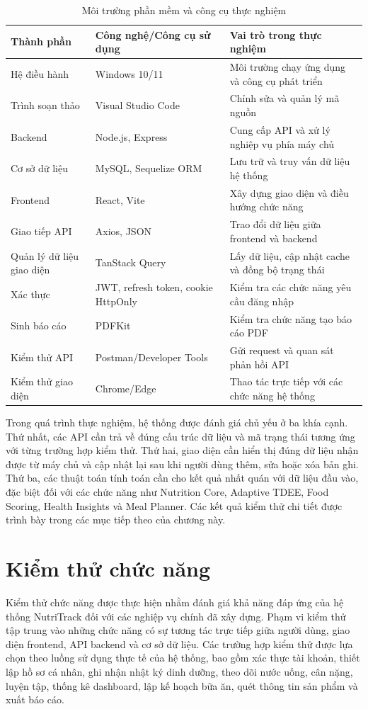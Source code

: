 \documentclass[12pt, a4paper]{report}
\begin{document}
\begin{table}[htbp]
\centering
\caption{Môi trường phần mềm và công cụ thực nghiệm}
\begin{tabular}{|p{4cm}|p{4cm}|p{7cm}|}
\hline
\textbf{Thành phần} & \textbf{Công nghệ/Công cụ sử dụng} & \textbf{Vai trò trong thực nghiệm} \\
\hline
Hệ điều hành & Windows 10/11 & Môi trường chạy ứng dụng và công cụ phát triển \\
\hline
Trình soạn thảo & Visual Studio Code & Chỉnh sửa và quản lý mã nguồn \\
\hline
Backend & Node.js, Express & Cung cấp API và xử lý nghiệp vụ phía máy chủ \\
\hline
Cơ sở dữ liệu & MySQL, Sequelize ORM & Lưu trữ và truy vấn dữ liệu hệ thống \\
\hline
Frontend & React, Vite & Xây dựng giao diện và điều hướng chức năng \\
\hline
Giao tiếp API & Axios, JSON & Trao đổi dữ liệu giữa frontend và backend \\
\hline
Quản lý dữ liệu giao diện & TanStack Query & Lấy dữ liệu, cập nhật cache và đồng bộ trạng thái \\
\hline
Xác thực & JWT, refresh token, cookie HttpOnly & Kiểm tra các chức năng yêu cầu đăng nhập \\
\hline
Sinh báo cáo & PDFKit & Kiểm tra chức năng tạo báo cáo PDF \\
\hline
Kiểm thử API & Postman/Developer Tools & Gửi request và quan sát phản hồi API \\
\hline
Kiểm thử giao diện & Chrome/Edge & Thao tác trực tiếp với các chức năng hệ thống \\
\hline
\end{tabular}
\end{table}
Trong quá trình thực nghiệm, hệ thống được đánh giá chủ yếu ở ba khía cạnh. Thứ nhất, các API cần trả về đúng cấu trúc dữ liệu và mã trạng thái tương ứng với từng trường hợp kiểm thử. Thứ hai, giao diện cần hiển thị đúng dữ liệu nhận được từ máy chủ và cập nhật lại sau khi người dùng thêm, sửa hoặc xóa bản ghi. Thứ ba, các thuật toán tính toán cần cho kết quả nhất quán với dữ liệu đầu vào, đặc biệt đối với các chức năng như Nutrition Core, Adaptive TDEE, Food Scoring, Health Insights và Meal Planner. Các kết quả kiểm thử chi tiết được trình bày trong các mục tiếp theo của chương này.

\section{Kiểm thử chức năng}Kiểm thử chức năng được thực hiện nhằm đánh giá khả năng đáp ứng của hệ thống NutriTrack đối với các nghiệp vụ chính đã xây dựng. Phạm vi kiểm thử tập trung vào những chức năng có sự tương tác trực tiếp giữa người dùng, giao diện frontend, API backend và cơ sở dữ liệu. Các trường hợp kiểm thử được lựa chọn theo luồng sử dụng thực tế của hệ thống, bao gồm xác thực tài khoản, thiết lập hồ sơ cá nhân, ghi nhận nhật ký dinh dưỡng, theo dõi nước uống, cân nặng, luyện tập, thống kê dashboard, lập kế hoạch bữa ăn, quét thông tin sản phẩm và xuất báo cáo.
\end{document}
